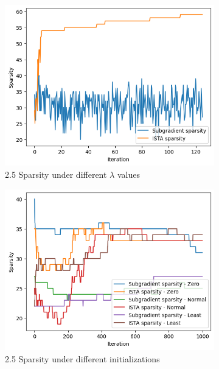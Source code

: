 \documentclass[11pt]{article}
\begin{document}
\begin{figure}[H]
    \centering
    \begin{subfigure}[t]{0.32\textwidth}
        \centering
        \includegraphics[width=\textwidth]{figures/fig5.png}
        \caption{2.5 Sparsity under different $\lambda$ values}
    \end{subfigure}
    \hfill
    \begin{subfigure}[t]{0.32\textwidth}
        \centering
        \includegraphics[width=\textwidth]{figures/fig6.png}
        \caption{2.5 Sparsity under different initializations}
    \end{subfigure}
    \hfill
    \begin{subfigure}[t]{0.32\textwidth}

\end{subfigure}
\end{figure}
\end{document}
